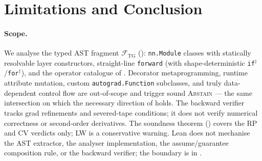 \section{Limitations and Conclusion}\label{sec:limconc}

\paragraph{Scope.} We analyse the typed AST fragment
$\mathcal{F}_{\mathrm{TG}}$ ():
\texttt{nn.Module} classes with statically resolvable layer
constructors, straight-line \texttt{forward} (with
shape-deterministic \texttt{if}$^\dagger$/\texttt{for}$^\dagger$),
and the operator catalogue of .
Decorator metaprogramming, runtime attribute mutation, custom
\texttt{autograd.Function} subclasses, and truly data-dependent
control flow are out-of-scope and trigger sound
\textsc{Abstain} --- the same intersection on which the
necessary direction of  holds. The
backward verifier tracks grad refinements and severed-tape
conditions; it does not verify numerical correctness or
second-order derivatives. The soundness theorem
() covers the \textsc{RP} and \textsc{CV}
verdicts only; \textsc{LW} is a conservative warning.
Lean does not mechanise the AST extractor, the analyser
implementation, the assume/guarantee composition rule, or the
backward verifier; the boundary is in
.

